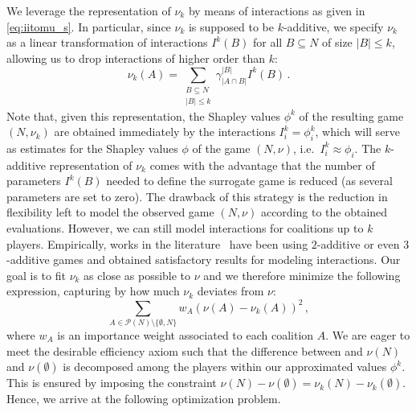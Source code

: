 We leverage the representation of $\nu_k$ by means of interactions as given in \cref{eq:iitomu_s}.
In particular, since $\nu_k$ is supposed to be $k$-additive, we specify $\nu_k$ as a linear transformation of interactions $I^k(B)$ for all $B \subseteq N$ of size $|B| \leq k$, allowing us to drop interactions of higher order than $k$: 
\begin{equation}
    \nu_k(A) = \sum_{\substack{B \subseteq N \\ |B| \leq k}} \gamma^{\left|B \right|}_{\left| A \cap B \right|} I^k(B) \, .
\end{equation}
Note that, given this representation, the Shapley values $\phi^k$ of the resulting game $(N,\nu_k)$ are obtained immediately by the interactions $I_i^k = \phi_i^k$, which will serve as estimates for the Shapley values $\phi$ of the game $(N,\nu)$, i.e.\ $I_i^k \approx \phi_i$.
The $k$-additive representation of $\nu_k$ comes with the advantage that the number of parameters $I^k(B)$ needed to define the surrogate game is reduced (as several parameters are set to zero).
The drawback of this strategy is the reduction in flexibility left to model the observed game $(N,\nu)$ according to the obtained evaluations.
However, we can still model interactions for coalitions up to $k$ players.
Empirically, works in the literature~\citep{Grabisch2002,Grabisch2006,Pelegrina2020,Pelegrina.2023} have been using $2$-additive or even $3$-additive games and obtained satisfactory results for modeling interactions.
Our goal is to fit $\nu_k$ as close as possible to $\nu$ and we therefore minimize the following expression, capturing by how much $\nu_k$ deviates from $\nu$:
\begin{equation}
    \sum_{A \in \mathcal{P}(N) \setminus \{\emptyset, N\}} w_A \left( \nu(A) - \nu_k(A) \right)^2 \, ,
\end{equation}
where $w_A$ is an importance weight associated to each coalition $A$.
We are eager to meet the desirable efficiency axiom such that the difference between and $\nu(N)$ and $\nu(\emptyset)$ is decomposed among the players within our approximated values $\phi^k$.
This is ensured by imposing the constraint $\nu(N) - \nu(\emptyset) = \nu_k(N) - \nu_k(\emptyset)$.
Hence, we arrive at the following optimization problem.
